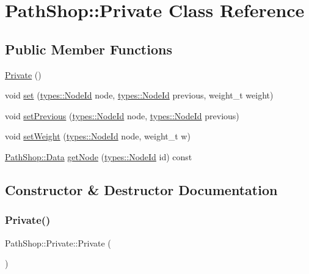 \hypertarget{class_path_shop_1_1_private}{}\section{Path\+Shop\+::Private Class Reference}
\label{class_path_shop_1_1_private}
\subsection*{Public Member Functions}
\begin{DoxyCompactItemize}
\item 
\mbox{\hyperlink{class_path_shop_1_1_private_abc3e61dbf6c60e6a18c2550d46f55fb3}{Private}} ()
\item 
void \mbox{\hyperlink{class_path_shop_1_1_private_ade5f61c79c74a1e7ae35ba98f61d75ba}{set}} (\mbox{\hyperlink{classtypes_1_1_node_id}{types\+::\+Node\+Id}} node, \mbox{\hyperlink{classtypes_1_1_node_id}{types\+::\+Node\+Id}} previous, weight\+\_\+t weight)
\item 
void \mbox{\hyperlink{class_path_shop_1_1_private_a7ff2fa3e5859e76743e8511f5ba9827e}{set\+Previous}} (\mbox{\hyperlink{classtypes_1_1_node_id}{types\+::\+Node\+Id}} node, \mbox{\hyperlink{classtypes_1_1_node_id}{types\+::\+Node\+Id}} previous)
\item 
void \mbox{\hyperlink{class_path_shop_1_1_private_ab2e532d00fb1780550035e81aeecb9d4}{set\+Weight}} (\mbox{\hyperlink{classtypes_1_1_node_id}{types\+::\+Node\+Id}} node, weight\+\_\+t w)
\item 
\mbox{\hyperlink{class_path_shop_1_1_data}{Path\+Shop\+::\+Data}} \mbox{\hyperlink{class_path_shop_1_1_private_a62040de00b2565a4c34ffb5da53b6ccd}{get\+Node}} (\mbox{\hyperlink{classtypes_1_1_node_id}{types\+::\+Node\+Id}} id) const
\end{DoxyCompactItemize}


\subsection{Constructor \& Destructor Documentation}
\mbox{\label{class_path_shop_1_1_private_abc3e61dbf6c60e6a18c2550d46f55fb3}} 
\subsubsection{\texorpdfstring{Private()}{Private()}}
{\footnotesize\ttfamily Path\+Shop\+::\+Private\+::\+Private (\begin{DoxyParamCaption}{ }\end{DoxyParamCaption})\hspace{0.3cm}{\ttfamily [inline]}}



